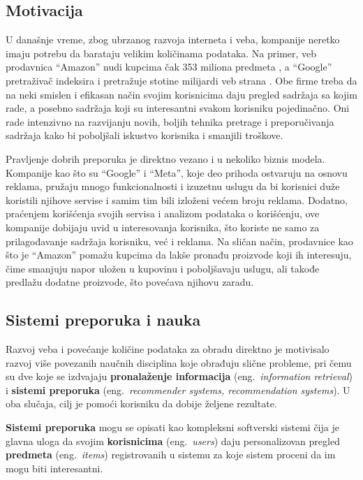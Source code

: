 \documentclass[a4paper]{article}
\begin{document}
\subsection{Motivacija}
\label{subsec:motivacija}

U današnje vreme, zbog ubrzanog razvoja interneta i veba, kompanije neretko imaju potrebu da barataju velikim količinama podataka. Na primer, veb prodavnica ``Amazon'' nudi kupcima čak 353 miliona predmeta \cite{noauthor_57_2022}, a ``Google'' pretraživač indeksira i pretražuje stotine milijardi veb strana \cite{noauthor_organizing_nodate}. Obe firme treba da na neki smislen i efikasan način svojim korisnicima daju pregled sadržaja sa kojim rade, a posebno sadržaja koji su interesantni svakom korisniku pojedinačno. Oni rade intenzivno na razvijanju novih, boljih tehnika pretrage i preporučivanja sadržaja kako bi poboljšali iskustvo korisnika i smanjili troškove.

Pravljenje dobrih preporuka je direktno vezano i u nekoliko biznis modela. Kompanije kao što su ``Google'' i ``Meta'', koje deo prihoda ostvaruju na osnovu reklama, pružaju mnogo funkcionalnosti i izuzetnu uslugu da bi korisnici duže koristili njihove servise i samim tim bili izloženi većem broju reklama. Dodatno, praćenjem korišćenja svojih servisa i analizom podataka o korišćenju, ove kompanije dobijaju uvid u interesovanja korisnika, što koriste ne samo za prilagođavanje sadržaja korisniku, već i reklama. Na sličan način, prodavnice kao što je ``Amazon'' pomažu kupcima da lakše pronađu proizvode koji ih interesuju, čime smanjuju napor uložen u kupovinu i poboljšavaju uslugu, ali takođe predlažu dodatne proizvode, što povećava njihovu zaradu.

\subsection{Sistemi preporuka i nauka}
\label{subsec:nauka}

Razvoj veba i povećanje količine podataka za obradu direktno je motivisalo razvoj više povezanih naučnih disciplina koje obrađuju slične probleme, pri čemu su dve koje se izdvajaju \textbf{pronalaženje informacija} (eng.~{\em information retrieval}) i \textbf{sistemi preporuka} (eng.~{\em recommender systems, recommendation systems}). U oba slučaja, cilj je pomoći korisniku da dobije željene rezultate.

\textbf{Sistemi preporuka} mogu se opisati kao kompleksni softverski sistemi čija je glavna uloga da svojim \textbf{korisnicima} (eng.~{\em users}) daju personalizovan pregled \textbf{predmeta} (eng.~{\em items}) registrovanih u sistemu za koje sistem proceni da im mogu biti interesantni.
\end{document}
